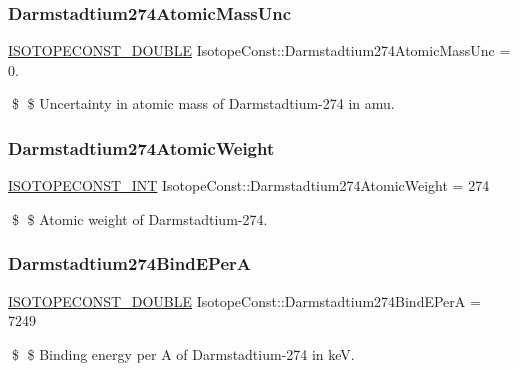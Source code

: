 \subsubsection{\texorpdfstring{Darmstadtium274\+Atomic\+Mass\+Unc}{Darmstadtium274AtomicMassUnc}}
{\footnotesize\ttfamily \mbox{\hyperlink{group___isotope_const-_macros_ga8f45a7272ce02c0b4c65c44636ed719a}{I\+S\+O\+T\+O\+P\+E\+C\+O\+N\+S\+T\+\_\+\+D\+O\+U\+B\+LE}} Isotope\+Const\+::\+Darmstadtium274\+Atomic\+Mass\+Unc = 0.}

\$ \$ Uncertainty in atomic mass of Darmstadtium-\/274 in amu. \mbox{\label{group___isotope_const-_darmstadtium-_ds274_gaf84e26c3f2c33c78bfd5dd4f774d9a4d}} 
\subsubsection{\texorpdfstring{Darmstadtium274\+Atomic\+Weight}{Darmstadtium274AtomicWeight}}
{\footnotesize\ttfamily \mbox{\hyperlink{group___isotope_const-_macros_ga5f18360b3e99483a35c32d789e62621c}{I\+S\+O\+T\+O\+P\+E\+C\+O\+N\+S\+T\+\_\+\+I\+NT}} Isotope\+Const\+::\+Darmstadtium274\+Atomic\+Weight = 274}

\$ \$ Atomic weight of Darmstadtium-\/274. \mbox{\label{group___isotope_const-_darmstadtium-_ds274_gaf112f083a01f10bf3a8a23ae205e1119}} 
\subsubsection{\texorpdfstring{Darmstadtium274\+Bind\+E\+PerA}{Darmstadtium274BindEPerA}}
{\footnotesize\ttfamily \mbox{\hyperlink{group___isotope_const-_macros_ga8f45a7272ce02c0b4c65c44636ed719a}{I\+S\+O\+T\+O\+P\+E\+C\+O\+N\+S\+T\+\_\+\+D\+O\+U\+B\+LE}} Isotope\+Const\+::\+Darmstadtium274\+Bind\+E\+PerA = 7249}

\$ \$ Binding energy per A of Darmstadtium-\/274 in keV. \mbox{\label{group___isotope_const-_darmstadtium-_ds274_gaa9d25effede4e7ccd414800e6f14abc6}} 
